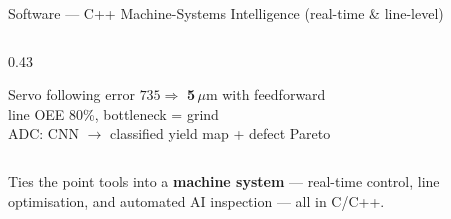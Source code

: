 \documentclass[aspectratio=169,11pt]{beamer}
\begin{document}
\begin{frame}[shrink=10]{Software --- C++ Machine-Systems Intelligence (real-time \& line-level)}
\begin{columns}[T]
\begin{column}{0.43\textwidth}
      \vspace{0.3em}
      \begin{block}{}
        \footnotesize
        Servo following error $735 \Rightarrow$
          \textcolor{discoblue}{\textbf{5}}\,$\mu$m with feedforward\\
        line OEE 80\%, bottleneck = grind\\
        ADC: CNN $\to$ classified yield map + defect Pareto
      \end{block}
    \end{column}
  \end{columns}
  \vspace{0.2em}
  {\footnotesize\textcolor{discogray}{Ties the point tools into a \textbf{machine
    system} --- real-time control, line optimisation, and automated AI
    inspection --- all in C/C++.}}
\end{frame}
\end{document}
